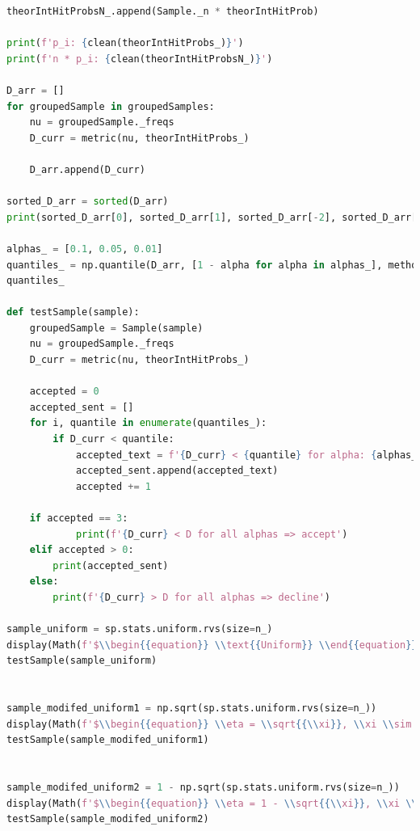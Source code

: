 \documentclass[a4paper, 14pt]{extarticle}
\begin{document}
\begin{center}
\begin{lstlisting}[language=Python]
    theorIntHitProbsN_.append(Sample._n * theorIntHitProb)

print(f'p_i: {clean(theorIntHitProbs_)}')
print(f'n * p_i: {clean(theorIntHitProbsN_)}')

D_arr = []
for groupedSample in groupedSamples:
    nu = groupedSample._freqs
    D_curr = metric(nu, theorIntHitProbs_)

    D_arr.append(D_curr)

sorted_D_arr = sorted(D_arr)
print(sorted_D_arr[0], sorted_D_arr[1], sorted_D_arr[-2], sorted_D_arr[-1])

alphas_ = [0.1, 0.05, 0.01]
quantiles_ = np.quantile(D_arr, [1 - alpha for alpha in alphas_], method='inverted_cdf')
quantiles_

def testSample(sample):
    groupedSample = Sample(sample)
    nu = groupedSample._freqs
    D_curr = metric(nu, theorIntHitProbs_)

    accepted = 0
    accepted_sent = []
    for i, quantile in enumerate(quantiles_):
        if D_curr < quantile:
            accepted_text = f'{D_curr} < {quantile} for alpha: {alphas_[i]} => accept(alpha={alphas_[i]})\n'
            accepted_sent.append(accepted_text)
            accepted += 1

    if accepted == 3:
            print(f'{D_curr} < D for all alphas => accept')
    elif accepted > 0:
        print(accepted_sent)
    else:
        print(f'{D_curr} > D for all alphas => decline')

sample_uniform = sp.stats.uniform.rvs(size=n_)
display(Math(f'$\\begin{{equation}} \\text{{Uniform}} \\end{{equation}}$'))
testSample(sample_uniform)


sample_modifed_uniform1 = np.sqrt(sp.stats.uniform.rvs(size=n_))
display(Math(f'$\\begin{{equation}} \\eta = \\sqrt{{\\xi}}, \\xi \\sim R[0, 1] \\end{{equation}}$'))
testSample(sample_modifed_uniform1)


sample_modifed_uniform2 = 1 - np.sqrt(sp.stats.uniform.rvs(size=n_))
display(Math(f'$\\begin{{equation}} \\eta = 1 - \\sqrt{{\\xi}}, \\xi \\sim R[0, 1] \\end{{equation}}$'))
testSample(sample_modifed_uniform2)



\end{lstlisting}
\end{center}
\end{document}
